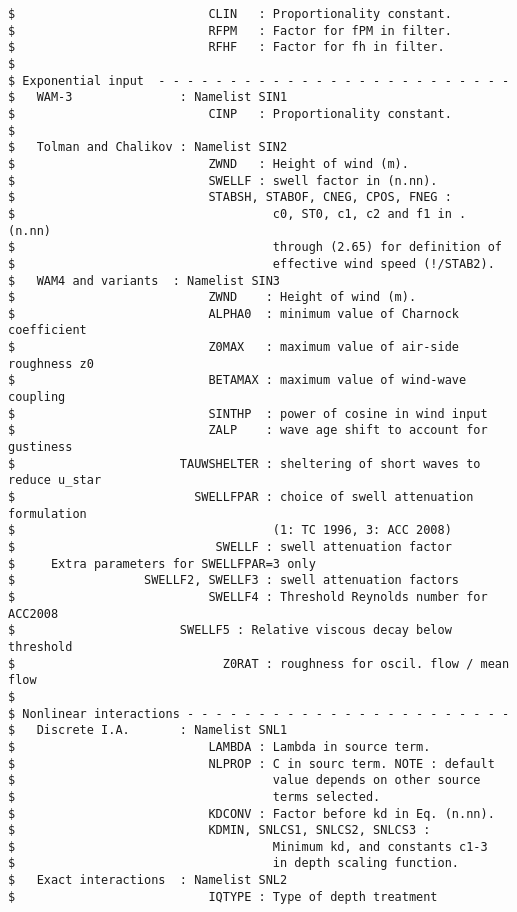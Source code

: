 \begin{verbatim}
$                           CLIN   : Proportionality constant.
$                           RFPM   : Factor for fPM in filter.
$                           RFHF   : Factor for fh in filter.
$
$ Exponential input  - - - - - - - - - - - - - - - - - - - - - - - - -
$   WAM-3               : Namelist SIN1
$                           CINP   : Proportionality constant.
$
$   Tolman and Chalikov : Namelist SIN2
$                           ZWND   : Height of wind (m).
$                           SWELLF : swell factor in (n.nn).
$                           STABSH, STABOF, CNEG, CPOS, FNEG :
$                                    c0, ST0, c1, c2 and f1 in . (n.nn)
$                                    through (2.65) for definition of
$                                    effective wind speed (!/STAB2).
$   WAM4 and variants  : Namelist SIN3
$                           ZWND    : Height of wind (m).
$                           ALPHA0  : minimum value of Charnock coefficient
$                           Z0MAX   : maximum value of air-side roughness z0
$                           BETAMAX : maximum value of wind-wave coupling
$                           SINTHP  : power of cosine in wind input
$                           ZALP    : wave age shift to account for gustiness
$                       TAUWSHELTER : sheltering of short waves to reduce u_star
$                         SWELLFPAR : choice of swell attenuation formulation 
$                                    (1: TC 1996, 3: ACC 2008)
$                            SWELLF : swell attenuation factor
$     Extra parameters for SWELLFPAR=3 only 
$                  SWELLF2, SWELLF3 : swell attenuation factors 
$                           SWELLF4 : Threshold Reynolds number for ACC2008
$                  	    SWELLF5 : Relative viscous decay below threshold
$                             Z0RAT : roughness for oscil. flow / mean flow      
$
$ Nonlinear interactions - - - - - - - - - - - - - - - - - - - - - - -
$   Discrete I.A.       : Namelist SNL1
$                           LAMBDA : Lambda in source term.
$                           NLPROP : C in sourc term. NOTE : default
$                                    value depends on other source
$                                    terms selected.
$                           KDCONV : Factor before kd in Eq. (n.nn).
$                           KDMIN, SNLCS1, SNLCS2, SNLCS3 :
$                                    Minimum kd, and constants c1-3
$                                    in depth scaling function.
$   Exact interactions  : Namelist SNL2
$                           IQTYPE : Type of depth treatment

\end{verbatim}
